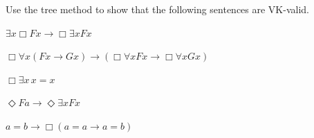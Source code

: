 %
%
%

\begin{exercise}
  Use the tree method to show that the following sentences are VK-valid.
  \begin{exlist}
  \item $\exists x \Box Fx \to \Box \exists x Fx$
  \item $\Box\forall x(Fx \to Gx) \to (\Box\forall x Fx \to \Box \forall x Gx)$ %
  \item $\Box \exists x \, x\!=\!x$
  \item $\Diamond Fa \to \Diamond \exists x Fx$
  \item $a\!=\!b \to \Box(a\!=\!a \to a\!=\!b)$
  \end{exlist}
\end{exercise}
